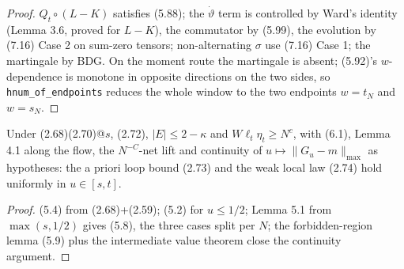 \begin{proof}\leanok
  $Q_t\circ(L-K)$ satisfies (5.88); the $\dot\vartheta$ term is controlled by Ward's identity
  (Lemma 3.6, proved for $L-K$), the commutator by (5.99), the evolution by (7.16) Case 2 on sum-zero
  tensors; non-alternating $\sigma$ use (7.16) Case 1; the martingale by BDG.
  On the moment route the martingale is absent; (5.92)'s $w$-dependence is monotone in opposite
  directions on the two sides, so \texttt{hnum\_of\_endpoints} reduces the whole window to the two
  endpoints $w=t_N$ and $w=s_N$.
\end{proof}

\begin{theorem}\label{thm:step1}
  \leanok{}
  Under (2.68)(2.70)@$s$, (2.72), $|E|\le2-\kappa$ and $W\ell_t\eta_t\ge N^{c}$, with (6.1), Lemma 4.1
  along the flow, the $N^{-C}$-net lift and continuity of $u\mapsto\|G_u-m\|_{\max}$ as hypotheses:
  the a priori loop bound (2.73) and the weak local law (2.74) hold uniformly in $u\in[s,t]$.
\end{theorem}
\begin{proof}\leanok
  (5.4) from (2.68)+(2.59); (5.2) for $u\le1/2$; Lemma 5.1 from $\max(s,1/2)$ gives (5.8), the three
  cases split per $N$; the forbidden-region lemma (5.9) plus the intermediate value theorem close the
  continuity argument.
\end{proof}

